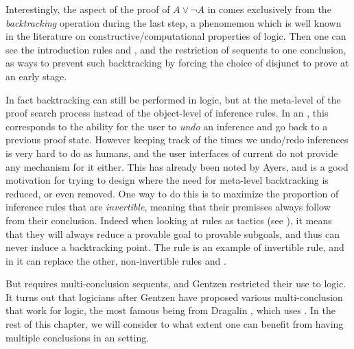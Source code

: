 Interestingly, the  aspect of the proof of $A \lor \neg A$ in
 comes exclusively from the \emph{backtracking} operation during
the last step, a phenomemon which is well known in the literature on
constructive/computational properties of  logic.
Then one can see the introduction rules {} and {},
and the restriction of  sequents to one conclusion, as ways to
prevent such backtracking by forcing the choice of disjunct to prove at an early
stage.

In fact backtracking can still be performed in  logic, but at the
meta-level of the proof search process instead of the object-level of inference
rules. In an , this corresponds to the ability for the
user to \emph{undo} an inference and go back to a previous proof state. However
keeping track of the times we undo/redo inferences is very hard to do as humans,
and the user interfaces of current  do not provide any mechanism
for it either. This has already been noted by Ayers, and is a good motivation for trying to design
 where the need for meta-level backtracking is reduced, or even
removed. One way to do this is to maximize the proportion of inference rules
that are \emph{invertible}, meaning that their premisses always follow from
their conclusion. Indeed when looking at rules as tactics (see ),
it means that they will always reduce a provable goal to provable subgoals, and
thus can never induce a backtracking point. The {} rule is an example of
invertible rule, and in  it can replace the other, non-invertible rules
{} and {}.

But {} requires multi-conclusion sequents, and Gentzen restricted
their use to  logic. It turns out that logicians after Gentzen have
proposed various multi-conclusion  that work for 
logic, the most famous being  from Dragalin
, which uses {}. In the rest of
this chapter, we will consider to what extent one can benefit from having
multiple conclusions in an  setting.

